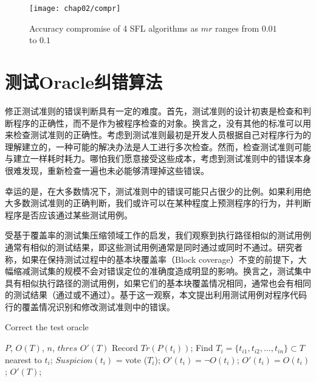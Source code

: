 \begin{figure*}
	\centering
	\texttt{[image: chap02/compr]}
	\caption{Accuracy compromise of 4 SFL algorithms as $mr$ ranges from $0.01$ to $0.1$}
	\label{fig:compr}
\end{figure*}
\section{测试Oracle纠错算法}
修正测试准则的错误判断具有一定的难度。首先，测试准则的设计初衷是检查和判断程序的正确性，而不是作为被程序检查的对象。换言之，没有其他的标准可以用来检查测试准则的正确性。考虑到测试准则最初是开发人员根据自己对程序行为的理解建立的，一种可能的解决办法是人工进行多次检查。然而，检查测试准则可能与建立一样耗时耗力。哪怕我们愿意接受这些成本，考虑到测试准则中的错误本身很难发现，重新检查一遍也未必能够清理掉这些错误。

幸运的是，在大多数情况下，测试准则中的错误可能只占很少的比例。如果利用绝大多数测试准则的正确判断，我们或许可以在某种程度上预测程序的行为，并判断程序是否应该通过某些测试用例。

受基于覆盖率的测试集压缩领域工作\cite{wong1995effect}\cite{wong1999test}的启发，我们观察到执行路径相似的测试用例通常有相似的测试结果，即这些测试用例通常是同时通过或同时不通过。研究者称，如果在保持测试过程中的基本块覆盖率（Block coverage）不变的前提下，大幅缩减测试集的规模不会对错误定位的准确度造成明显的影响。换言之，测试集中具有相似执行路径的测试用例，如果它们的基本块覆盖情况相同，通常也会有相同的测试结果（通过或不通过）。基于这一观察，本文提出利用测试用例对程序代码行的覆盖情况识别和修改测试准则中的错误。

\begin{algorithm}
	\caption{Correct the test oracle}
	\label{alg: debugMain}
	\begin{algorithmic}[1]
		\renewcommand{\algorithmicrequire}{\textbf{Input:}}
		\renewcommand\algorithmicensure {\textbf{Output:} }
		\REQUIRE $P$, $O(T)$, $n$, $thres$
		\ENSURE $O'(T)$
		\STATE Record $Tr(P(t_i))$;
		\ENDFOR
		\STATE Find $T_i = \{t_{i1}, t_{i2}, \ldots, t_{in}\} \subset T$ nearest to $t_i$;
		\STATE $Suspicion(t_i)$ = vote ($T_i$);
		\STATE $O'(t_i) = \neg O(t_i)$;
		\ELSE
		\STATE $O'(t_i) = O(t_i)$;
		\ENDIF
		\ENDFOR
		\RETURN $O'(T)$;
		
	\end{algorithmic}
\end{algorithm}

